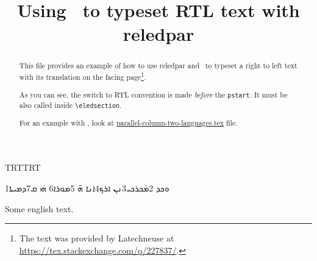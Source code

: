 \documentclass{article}
\newcommand{\textsyriac}[1] %
             {\bgroup\textdir TRT\syriacfont #1\egroup}
\newenvironment{syriac}     %
             {\textdir TRT\pardir TRT\syriacfont}{}
\renewcommand{\textsyriac}[1]{\bgroup\syriacfont #1\egroup}
\begin{document}
\date{}
\title{Using \LuaLaTeX\ to typeset RTL text with reledpar}
\maketitle
\begin{abstract}
This file provides an example of how to use reledpar and \LuaLaTeX\ to typeset a right to left text with its translation on the facing page\footnote{The text was provided by Latechneuse at \url{https://tex.stackexchange.com/q/227837/}.}.  

As you can see, the switch to RTL convention is made \emph{before} the \verb+pstart+.
It must be also called inside \verb+\eledsection+.

For an example with \XeLaTeX, look at \href{./parallel-column-two-languages.tex}{parallel-column-two-languages.tex} file.
\end{abstract}

\begin{pages}
\begin{Leftside}
\begin{syriac}
\beginnumbering
   \pstart
       \eledsection*{\textsyriac{ܡܿܟܪܟܝ}}
   \pend

   \pstart
        1ܘܟܕ 2ܡܿܟܪܟܝ3ܢܢ ܐܪܟ4ܐܢܐ ܗ̄ 5ܡܘܪܐ6 ܗܿܝ ܩ7ܕܡܝܬܐ
   \pend
\endnumbering
\end{syriac}
\end{Leftside}

\begin{Rightside}
\beginnumbering
   \pstart
   \pend

   \pstart
        Some english text. 
   \pend
\endnumbering
\end{Rightside}

\end{pages} 
\Pages
\end{document}
